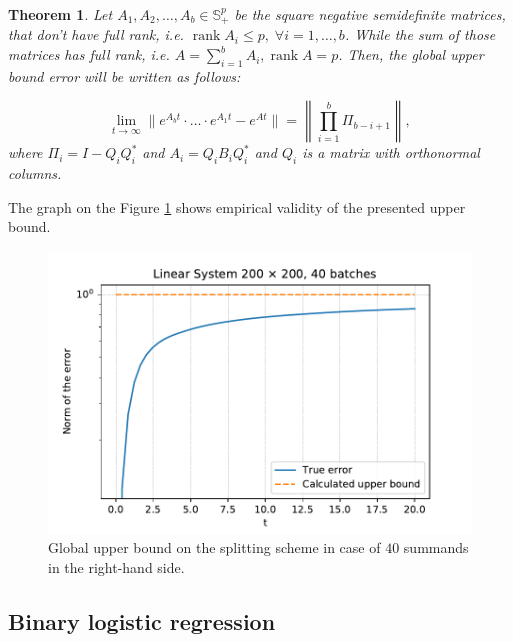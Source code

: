 \documentclass{article}
\newtheorem{theorem}{Theorem}
\begin{document}
\begin{theorem}\label{strang:theorem_uppbound}
	Let $A_1, A_2, \ldots, A_b \in \mathbb{S}^p_{+}$ be the square negative semidefinite matrices, that don't have full rank, i.e. $\operatorname{rank}{A_i} \leq p, \;\forall i = 1, \ldots, b$. While the sum of those matrices has full rank, i.e. $A = \sum\limits_{i=1}^b A_i, \operatorname{rank}{A} = p$. Then, the global upper bound error will be written as follows:

	\begin{equation}\label{strang:global_error_upper_bound}
		\lim_{t \to \infty}\| e^{A_bt} \cdot \ldots \cdot e^{A_1t} - e^{At}\| = \left\|\prod\limits_{i=1}^b \Pi_{b-i+1}\right\|,
	\end{equation}
	where $\Pi_i = I - Q_iQ_i^*$ and $A_i = Q_iB_iQ_i^*$ and $Q_i$ is a matrix with orthonormal columns. 
\end{theorem}

The graph on the Figure \ref{strang:fig:upper_bound_many} shows empirical validity of the presented upper bound.

\begin{figure}[ht]
\vskip 0.2in
\begin{center}
\centerline{\includegraphics[width=\columnwidth]{upper_bound_many.pdf}}
\caption{Global upper bound on the splitting scheme in case of $40$ summands in the right-hand side.}
\label{strang:fig:upper_bound_many}
\end{center}
\vskip -0.2in
\end{figure}

\subsection{Binary logistic regression}
\end{document}
